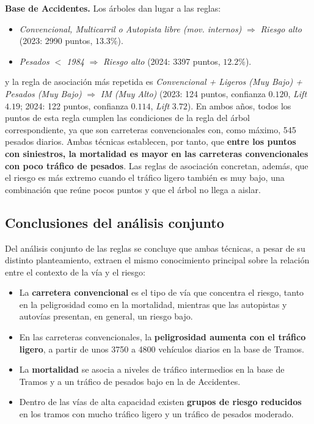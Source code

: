 \documentclass[twoside,a4paper,12pt,onecolumn,openany]{book}
\begin{document}
\textbf{Base de Accidentes.} Los árboles dan lugar a las reglas:
 
\begin{itemize}
    \item \textit{Convencional, Multicarril o Autopista libre (mov. internos)} $\Rightarrow$ \textit{Riesgo alto} (2023: 2990 puntos, $13.3\%$).
    \item \textit{Pesados $<$ 1984} $\Rightarrow$ \textit{Riesgo alto} (2024: 3397 puntos, $12.2\%$).
\end{itemize}
 
y la regla de asociación más repetida es \textit{Convencional + Ligeros (Muy Bajo) + Pesados (Muy Bajo)} $\Rightarrow$ \textit{IM (Muy Alto)} (2023: 124 puntos, confianza $0.120$, \textit{Lift} $4.19$; 2024: 122 puntos, confianza $0.114$, \textit{Lift} $3.72$). En ambos años, todos los puntos de esta regla cumplen las condiciones de la regla del árbol correspondiente, ya que son carreteras convencionales con, como máximo, 545 pesados diarios. Ambas técnicas establecen, por tanto, que \textbf{entre los puntos con siniestros, la mortalidad es mayor en las carreteras convencionales con poco tráfico de pesados}. Las reglas de asociación concretan, además, que el riesgo es más extremo cuando el tráfico ligero también es muy bajo, una combinación que reúne pocos puntos y que el árbol no llega a aislar.
 
\subsection{Conclusiones del análisis conjunto}
 
Del análisis conjunto de las reglas se concluye que ambas técnicas, a pesar de su distinto planteamiento, extraen el mismo conocimiento principal sobre la relación entre el contexto de la vía y el riesgo:
 
\begin{itemize}
    \item La \textbf{carretera convencional} es el tipo de vía que concentra el riesgo, tanto en la peligrosidad como en la mortalidad, mientras que las autopistas y autovías presentan, en general, un riesgo bajo.
    \item En las carreteras convencionales, la \textbf{peligrosidad aumenta con el tráfico ligero}, a partir de unos 3750 a 4800 vehículos diarios en la base de Tramos.
    \item La \textbf{mortalidad} se asocia a niveles de tráfico intermedios en la base de Tramos y a un tráfico de pesados bajo en la de Accidentes.
    \item Dentro de las vías de alta capacidad existen \textbf{grupos de riesgo reducidos} en los tramos con mucho tráfico ligero y un tráfico de pesados moderado.
\end{itemize}
 
\end{document}
